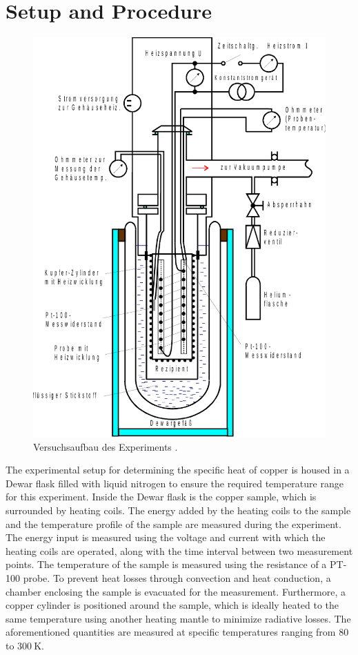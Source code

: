 \section{Setup and Procedure}
\begin{figure}[h]
    \centering
    \includegraphics[scale=0.65]{Aufbau.pdf}
    \caption{Versuchsaufbau des Experiments \cite{V47}.}
    \label{fig:aufbau}
\end{figure}
The experimental setup for determining the specific heat of copper is housed in a Dewar flask filled with liquid nitrogen to ensure the 
required temperature range for this experiment. Inside the Dewar flask is the copper sample, which is surrounded by heating coils. The 
energy added by the heating coils to the sample and the temperature profile of the sample are measured during the experiment. The energy 
input is measured using the voltage and current with which the heating coils are operated, along with the time interval between two measurement 
points. The temperature of the sample is measured using the resistance of a PT-100 probe. To prevent heat losses through convection and heat 
conduction, a chamber enclosing the sample is evacuated for the measurement. Furthermore, a copper cylinder is positioned around the sample, 
which is ideally heated to the same temperature using another heating mantle to minimize radiative losses. The aforementioned quantities are 
measured at specific temperatures ranging from $80$ to $\SI{300}{\kelvin}$.
